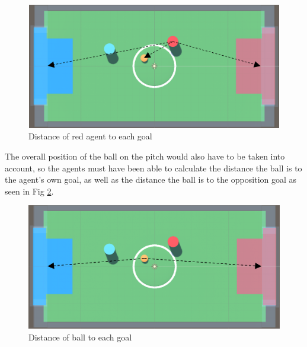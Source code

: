 \begin{figure}[H]
    \centering
    \includegraphics[width=115mm, height=55mm]{img/Image2.png}
    \caption{Distance of red agent to each goal}
    \label{fig:sd2}
\end{figure}

\begin{flushleft}
The overall position of the ball on the pitch would also have to be taken into account, so the agents must have been able to calculate the distance the ball is to the agent's own goal, as well as the distance the ball is to the opposition goal as seen in Fig \ref{fig:sd3}. 
\end{flushleft}

\begin{figure}[h]
    \centering
    \includegraphics[width=115mm, height=55mm]{img/Image3.png}
    \caption{Distance of ball to each goal}
    \label{fig:sd3}
\end{figure}

